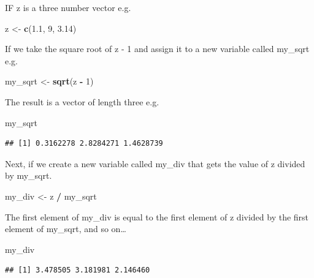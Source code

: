 \documentclass[]{book}
\newenvironment{Shaded}{\begin{snugshade}}{\end{snugshade}}
\newcommand{\KeywordTok}[1]{\textcolor[rgb]{0.13,0.29,0.53}{\textbf{#1}}}
\newcommand{\DecValTok}[1]{\textcolor[rgb]{0.00,0.00,0.81}{#1}}
\newcommand{\FloatTok}[1]{\textcolor[rgb]{0.00,0.00,0.81}{#1}}
\newcommand{\StringTok}[1]{\textcolor[rgb]{0.31,0.60,0.02}{#1}}
\newcommand{\OperatorTok}[1]{\textcolor[rgb]{0.81,0.36,0.00}{\textbf{#1}}}
\newcommand{\NormalTok}[1]{#1}
\theoremstyle{definition}
\theoremstyle{definition}
\theoremstyle{definition}
\theoremstyle{remark}
\begin{document}
IF z is a three number vector e.g.

\begin{Shaded}
\begin{Highlighting}[]
\NormalTok{z <-}\StringTok{ }\KeywordTok{c}\NormalTok{(}\FloatTok{1.1}\NormalTok{, }\DecValTok{9}\NormalTok{, }\FloatTok{3.14}\NormalTok{)}
\end{Highlighting}
\end{Shaded}

If we take the square root of z - 1 and assign it to a new variable
called my\_sqrt e.g.

\begin{Shaded}
\begin{Highlighting}[]
\NormalTok{my_sqrt <-}\StringTok{ }\KeywordTok{sqrt}\NormalTok{(z }\OperatorTok{-}\StringTok{ }\DecValTok{1}\NormalTok{)}
\end{Highlighting}
\end{Shaded}

The result is a vector of length three e.g.

\begin{Shaded}
\begin{Highlighting}[]
\NormalTok{my_sqrt}
\end{Highlighting}
\end{Shaded}

\begin{verbatim}
## [1] 0.3162278 2.8284271 1.4628739
\end{verbatim}

Next, if we create a new variable called my\_div that gets the value of
z divided by my\_sqrt.

\begin{Shaded}
\begin{Highlighting}[]
\NormalTok{my_div <-}\StringTok{ }\NormalTok{z }\OperatorTok{/}\StringTok{ }\NormalTok{my_sqrt}
\end{Highlighting}
\end{Shaded}

The first element of my\_div is equal to the first element of z divided
by the first element of my\_sqrt, and so on\ldots{}

\begin{Shaded}
\begin{Highlighting}[]
\NormalTok{my_div}
\end{Highlighting}
\end{Shaded}

\begin{verbatim}
## [1] 3.478505 3.181981 2.146460
\end{verbatim}
\end{document}
